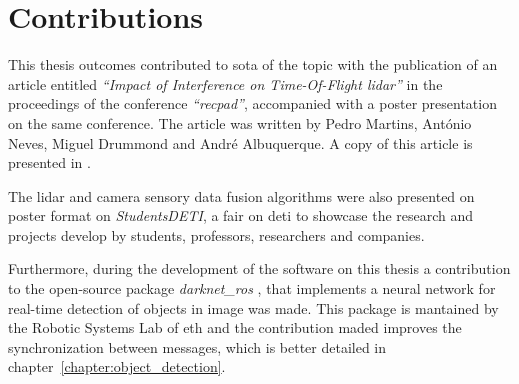 \section{Contributions} \label{section:introduction:contributions}
This thesis outcomes contributed to \acl{sota} of the topic with the publication of an article entitled \textit{``Impact of Interference on Time-Of-Flight \acs{lidar}''} in the proceedings of the conference \textit{``\acl{recpad}''}, accompanied with a poster presentation on the same conference. The article was written by Pedro Martins, António Neves, Miguel Drummond and André Albuquerque. A copy of this article is presented in .

The \ac{lidar} and camera sensory data fusion algorithms were also presented on poster format on \textit{Students\@ DETI}, a fair on  \acl{deti} to showcase the research and projects develop by students, professors, researchers and companies.

Furthermore, during the development of the software on this thesis a contribution to the open-source package \textit{darknet\_ros} \cite{MarkoBjelonic}, that implements a neural network for real-time detection of objects in image was made. This package is mantained by the Robotic Systems Lab of \acl{eth} and the contribution maded improves the synchronization between messages, which is better detailed in chapter~\ref{chapter:object_detection}.
